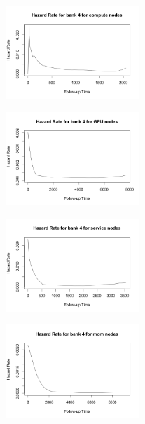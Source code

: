 \begin{t able}[t]
\begin{figure}
\centering
\includegraphics[width=0.45\textwidth]{images/haz_4_c.png}
\end{figure}

\begin{figure}
\centering
\includegraphics[width=0.45\textwidth]{images/haz_4_g.png}
\end{figure}

\begin{figure}
\centering
\includegraphics[width=0.45\textwidth]{images/haz_4_s.png}
\end{figure}

\begin{figure}
\centering
\includegraphics[width=0.45\textwidth]{images/haz_4_m.png}
\end{figure}


\end{t able}
